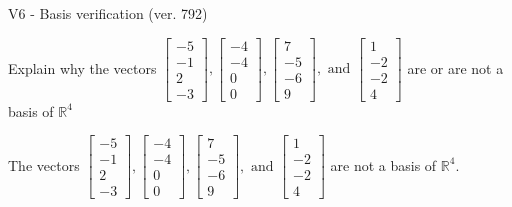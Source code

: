\begin{exercise}
  \begin{exerciseTitle}V6 - Basis verification (ver. 792)\end{exerciseTitle}
  \begin{exerciseStatement}
    Explain why the vectors \(\left[\begin{array}{r}
-5 \\
-1 \\
2 \\
-3
\end{array}\right] , \left[\begin{array}{r}
-4 \\
-4 \\
0 \\
0
\end{array}\right] , \left[\begin{array}{r}
7 \\
-5 \\
-6 \\
9
\end{array}\right] , \text{ and } \left[\begin{array}{r}
1 \\
-2 \\
-2 \\
4
\end{array}\right]\) are or are not a basis of \(\mathbb{R}^4\)	


  \end{exerciseStatement}
  \begin{exerciseAnswer}
   The vectors \(\left[\begin{array}{r}
-5 \\
-1 \\
2 \\
-3
\end{array}\right] , \left[\begin{array}{r}
-4 \\
-4 \\
0 \\
0
\end{array}\right] , \left[\begin{array}{r}
7 \\
-5 \\
-6 \\
9
\end{array}\right] , \text{ and } \left[\begin{array}{r}
1 \\
-2 \\
-2 \\
4
\end{array}\right]\) 
  	 are not  a basis of \(\mathbb{R}^4\).
  


  \end{exerciseAnswer}
\end{exercise}